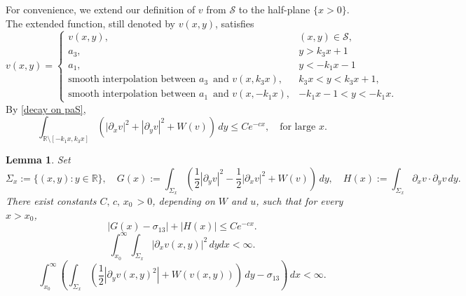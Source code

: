 \documentclass[leqno,11pt]{amsart}
\let\pa=\partial
\let\f=\frac
\let\S=\Sigma
\let\pa=\partial
\newtheorem{lemma}[theorem]{Lemma}
\theoremstyle{remark}
\newcommand{\BR}{\mathbb{R}}
\begin{document}
For convenience, we extend our definition of $v$ from $\mathcal{S}$ to the half-plane $\{x>0\}$. The extended function, still denoted by $v(x,y)$, satisfies
\begin{equation*}
    v(x,y)=\begin{cases}
        v(x,y), & (x,y)\in \mathcal{S},\\
        a_3,  &y> k_3x+1\\
        a_1,  &y<-k_1x-1\\ 
        \text{smooth interpolation between } a_3\,\text{ and }v(x, k_3x), &    k_3x<y< k_3x+1,\\
        \text{smooth interpolation between } a_1\,\text{ and }v(x, -k_1x), &     -k_1x-1<y<-k_1x.
    \end{cases}
\end{equation*}
By \eqref{decay on paS},
\begin{equation}\label{ene v negli}
 \int_{\BR\setminus [-k_1x,k_3x]} (|\pa_x v|^2+|\pa_y v|^2+W(v))\,dy \leq Ce^{-cx}, \quad \text{for large } x.  
\end{equation}

\begin{lemma}
 Set
    \begin{equation*}
       \Sigma_x:=\{(x,y):y\in \BR\},\quad  G(x):= \int_{\Sigma_x} \left(\f12|\pa_y v|^2-\f12|\pa_x v|^2+W(v)\right)\,dy, \quad H(x):= \int_{\Sigma_x} \pa_x v\cdot \pa_y v\,dy.
    \end{equation*}
    There exist constants $C,\,c,\,x_0\,>0$, depending on $W$ and $u$, such that for every $x>x_0$,  
    \begin{equation}\label{est: G H}
        \left|G(x) -\sigma_{13} \right|+|H(x)|\leq Ce^{-cx}.
    \end{equation}
    \begin{equation}\label{est: pa x}
        \int_{x_0}^\infty\int_{\S_x} |\pa_xv(x,y)|^2\,dydx< \infty.
    \end{equation}
    \begin{equation}\label{est: ene excess}
        \int_{x_0}^\infty\left(\int_{\S_x}  \left(\f12|\pa_y v(x,y)^2|+W(v(x,y))\right)\,dy-\sigma_{13}\right)\,dx<\infty.
    \end{equation}
\end{lemma}
\end{document}
